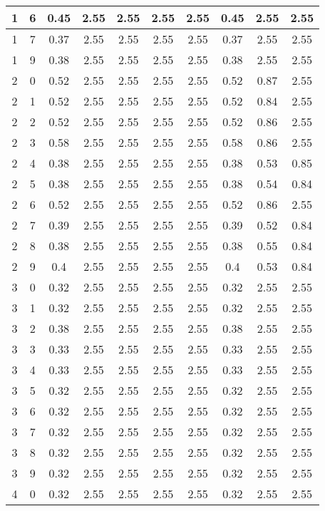 \begin{longtable}{|c|c||c||c|c|c|c||c|c|c|}
	1 & 6 & 0.45 & 2.55 & 2.55 & 2.55 & 2.55 & 0.45 & 2.55 & 2.55 \\ \hline
	1 & 7 & 0.37 & 2.55 & 2.55 & 2.55 & 2.55 & 0.37 & 2.55 & 2.55 \\ \hline
	1 & 9 & 0.38 & 2.55 & 2.55 & 2.55 & 2.55 & 0.38 & 2.55 & 2.55 \\ \hline
	2 & 0 & 0.52 & 2.55 & 2.55 & 2.55 & 2.55 & 0.52 & 0.87 & 2.55 \\ \hline
	2 & 1 & 0.52 & 2.55 & 2.55 & 2.55 & 2.55 & 0.52 & 0.84 & 2.55 \\ \hline
	2 & 2 & 0.52 & 2.55 & 2.55 & 2.55 & 2.55 & 0.52 & 0.86 & 2.55 \\ \hline
	2 & 3 & 0.58 & 2.55 & 2.55 & 2.55 & 2.55 & 0.58 & 0.86 & 2.55 \\ \hline
	2 & 4 & 0.38 & 2.55 & 2.55 & 2.55 & 2.55 & 0.38 & 0.53 & 0.85 \\ \hline
	2 & 5 & 0.38 & 2.55 & 2.55 & 2.55 & 2.55 & 0.38 & 0.54 & 0.84 \\ \hline
	2 & 6 & 0.52 & 2.55 & 2.55 & 2.55 & 2.55 & 0.52 & 0.86 & 2.55 \\ \hline
	2 & 7 & 0.39 & 2.55 & 2.55 & 2.55 & 2.55 & 0.39 & 0.52 & 0.84 \\ \hline
	2 & 8 & 0.38 & 2.55 & 2.55 & 2.55 & 2.55 & 0.38 & 0.55 & 0.84 \\ \hline
	2 & 9 & 0.4 & 2.55 & 2.55 & 2.55 & 2.55 & 0.4 & 0.53 & 0.84 \\ \hline
	3 & 0 & 0.32 & 2.55 & 2.55 & 2.55 & 2.55 & 0.32 & 2.55 & 2.55 \\ \hline
	3 & 1 & 0.32 & 2.55 & 2.55 & 2.55 & 2.55 & 0.32 & 2.55 & 2.55 \\ \hline
	3 & 2 & 0.38 & 2.55 & 2.55 & 2.55 & 2.55 & 0.38 & 2.55 & 2.55 \\ \hline
	3 & 3 & 0.33 & 2.55 & 2.55 & 2.55 & 2.55 & 0.33 & 2.55 & 2.55 \\ \hline
	3 & 4 & 0.33 & 2.55 & 2.55 & 2.55 & 2.55 & 0.33 & 2.55 & 2.55 \\ \hline
	3 & 5 & 0.32 & 2.55 & 2.55 & 2.55 & 2.55 & 0.32 & 2.55 & 2.55 \\ \hline
	3 & 6 & 0.32 & 2.55 & 2.55 & 2.55 & 2.55 & 0.32 & 2.55 & 2.55 \\ \hline
	3 & 7 & 0.32 & 2.55 & 2.55 & 2.55 & 2.55 & 0.32 & 2.55 & 2.55 \\ \hline
	3 & 8 & 0.32 & 2.55 & 2.55 & 2.55 & 2.55 & 0.32 & 2.55 & 2.55 \\ \hline
	3 & 9 & 0.32 & 2.55 & 2.55 & 2.55 & 2.55 & 0.32 & 2.55 & 2.55 \\ \hline
	4 & 0 & 0.32 & 2.55 & 2.55 & 2.55 & 2.55 & 0.32 & 2.55 & 2.55 \\ \hline

\end{longtable}
